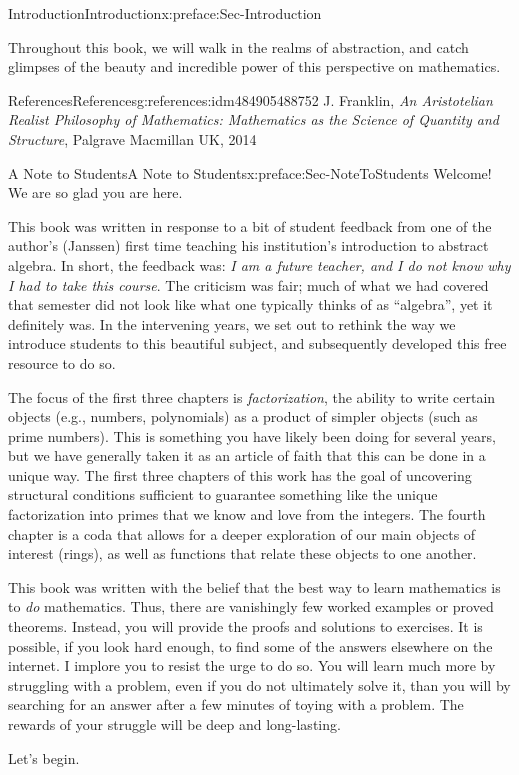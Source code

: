 \documentclass[oneside,10pt,]{book}
\numberwithin{equation}{section}
\begin{document}
\begin{preface}{Introduction}{}{Introduction}{}{}{x:preface:Sec-Introduction}
\par
Throughout this book, we will walk in the realms of abstraction, and catch glimpses of the beauty and incredible power of this perspective on mathematics.%
%
%
\typeout{************************************************}
\typeout{************************************************}
%
\begin{references--numberless}{References}{}{References}{}{}{g:references:idm484905488752}
J. Franklin, \emph{An Aristotelian Realist Philosophy of Mathematics: Mathematics as the Science of Quantity and Structure}, Palgrave Macmillan UK, 2014\end{references--numberless}
\end{preface}
%
%
\typeout{************************************************}
\typeout{************************************************}
%
\begin{preface}{A Note to Students}{}{A Note to Students}{}{}{x:preface:Sec-NoteToStudents}
Welcome! We are so glad you are here.%
\par
This book was written in response to a bit of student feedback from one of the author's (Janssen) first time teaching his institution's introduction to abstract algebra. In short, the feedback was: \emph{I am a future teacher, and I do not know why I had to take this course}. The criticism was fair; much of what we had covered that semester did not look like what one typically thinks of as ``algebra'', yet it definitely was. In the intervening years, we set out to rethink the way we introduce students to this beautiful subject, and subsequently developed this free resource to do so.%
\par
The focus of the first three chapters is \emph{factorization}, the ability to write certain objects (e.g., numbers, polynomials) as a product of simpler objects (such as prime numbers). This is something you have likely been doing for several years, but we have generally taken it as an article of faith that this can be done in a unique way. The first three chapters of this work has the goal of uncovering structural conditions sufficient to guarantee something like the unique factorization into primes that we know and love from the integers. The fourth chapter is a coda that allows for a deeper exploration of our main objects of interest (rings), as well as functions that relate these objects to one another.%
\par
This book was written with the belief that the best way to learn mathematics is to \emph{do} mathematics. Thus, there are vanishingly few worked examples or proved theorems. Instead, you will provide the proofs and solutions to exercises. It is possible, if you look hard enough, to find some of the answers elsewhere on the internet. I implore you to resist the urge to do so. You will learn much more by struggling with a problem, even if you do not ultimately solve it, than you will by searching for an answer after a few minutes of toying with a problem. The rewards of your struggle will be deep and long-lasting.%
\par
Let's begin.%
\end{preface}
\end{document}
